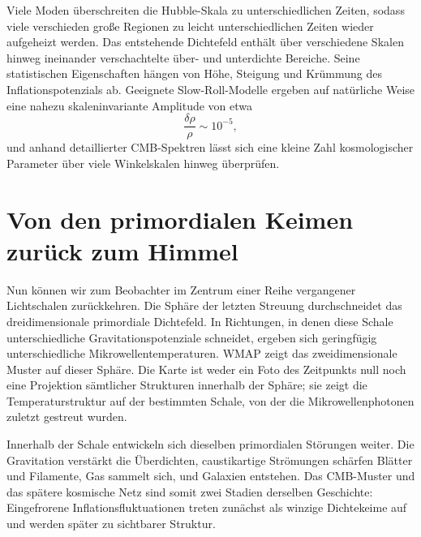 Viele Moden überschreiten die Hubble-Skala zu unterschiedlichen Zeiten, sodass viele verschieden große Regionen zu leicht unterschiedlichen Zeiten wieder aufgeheizt werden. Das entstehende Dichtefeld enthält über verschiedene Skalen hinweg ineinander verschachtelte über- und unterdichte Bereiche. Seine statistischen Eigenschaften hängen von Höhe, Steigung und Krümmung des Inflationspotenzials ab. Geeignete Slow-Roll-Modelle ergeben auf natürliche Weise eine nahezu skaleninvariante Amplitude von etwa
\[
\frac{\delta\rho}{\rho}\sim10^{-5},
\]
und anhand detaillierter CMB-Spektren lässt sich eine kleine Zahl kosmologischer Parameter über viele Winkelskalen hinweg überprüfen.

\section{Von den primordialen Keimen zurück zum Himmel}

Nun können wir zum Beobachter im Zentrum einer Reihe vergangener Lichtschalen zurückkehren. Die Sphäre der letzten Streuung durchschneidet das dreidimensionale primordiale Dichtefeld. In Richtungen, in denen diese Schale unterschiedliche Gravitationspotenziale schneidet, ergeben sich geringfügig unterschiedliche Mikrowellentemperaturen. WMAP zeigt das zweidimensionale Muster auf dieser Sphäre. Die Karte ist weder ein Foto des Zeitpunkts null noch eine Projektion sämtlicher Strukturen innerhalb der Sphäre; sie zeigt die Temperaturstruktur auf der bestimmten Schale, von der die Mikrowellenphotonen zuletzt gestreut wurden.

Innerhalb der Schale entwickeln sich dieselben primordialen Störungen weiter. Die Gravitation verstärkt die Überdichten, caustikartige Strömungen schärfen Blätter und Filamente, Gas sammelt sich, und Galaxien entstehen. Das CMB-Muster und das spätere kosmische Netz sind somit zwei Stadien derselben Geschichte: Eingefrorene Inflationsfluktuationen treten zunächst als winzige Dichtekeime auf und werden später zu sichtbarer Struktur.

\begin{classroomqa}
\end{classroomqa}

